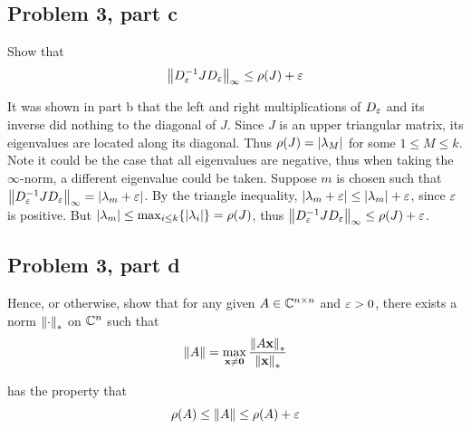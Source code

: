 \subsection{Problem 3, part c}
Show that 
\[ 
\norm{D_\varepsilon^{-1}JD_\varepsilon}_\infty \leq \rho(J) + \varepsilon
\]

\partbreak
\begin{solution}
    
It was shown in part b that the left and right multiplications of $D_\varepsilon$ and its inverse did nothing to the diagonal of $J$. Since $J$ is an upper triangular matrix, its eigenvalues are located along its diagonal. Thus $\rho(J) = |\lambda_M|$ for some $1 \leq M \leq k$. Note it could be the case that all eigenvalues are negative, thus when taking the $\infty$-norm, a different eigenvalue could be taken. Suppose $m$ is chosen such that $\norm{D_\varepsilon^{-1}JD_\varepsilon}_\infty = |\lambda_m + \varepsilon|$. By the triangle inequality, $|\lambda_m + \varepsilon| \leq |\lambda_m| + \varepsilon$, since $\varepsilon$ is positive. But $|\lambda_m| \leq \max_{i \leq k}\{|\lambda_i|\} = \rho(J)$, thus $\norm{D_\varepsilon^{-1}JD_\varepsilon}_\infty \leq \rho(J) + \varepsilon$. 
\end{solution}

\newpage
\subsection{Problem 3, part d}
Hence, or otherwise, show that for any given $A\in \mathbb{C}^{n\times n}$ and $\varepsilon > 0$, there exists a norm $\norm{\cdot}_*$ on $\mathbb{C}^n$ such that 
\[
\norm{A} = \max_{\textbf{x} \neq \textbf{0}} \frac{\norm{A\textbf{x}}_*}{\norm{\textbf{x}}_*}
\]

has the property that 
\[
\rho(A) \leq \norm{A} \leq \rho(A) + \varepsilon
\]
\partbreak

